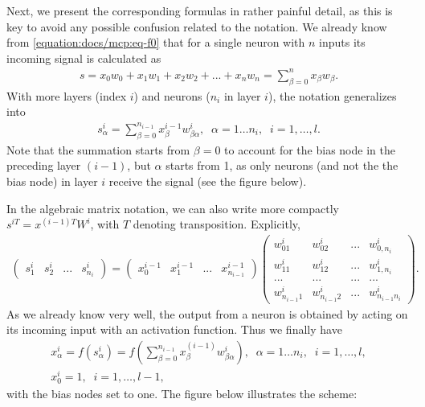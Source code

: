 \documentclass[letterpaper,10pt,english]{jupyterBook}
\begin{document}
\sphinxAtStartPar
Next, we present the corresponding formulas in rather painful detail, as this is key to avoid any possible confusion related to the notation.
We already know from \eqref{equation:docs/mcp:eq-f0} that for a single neuron with \(n\) inputs its incoming signal is calculated as
\begin{equation*}
\begin{split}s = x_0 w_0 + x_1 w_1 + x_2 w_2 + ... + x_n w_n = \sum_{\beta=0}^n x_\beta w_\beta .\end{split}
\end{equation*}
\sphinxAtStartPar
With more layers (index \(i\)) and neurons (\(n_i\) in layer \(i\)),
the notation generalizes into
\begin{equation*}
\begin{split}
s^i_\alpha=\sum_{\beta=0}^{n_{i-1}} x^{i-1}_\beta w^i_{\beta \alpha}, \;\; \alpha=1\dots n_i, \;\; i=1,\dots,l.
\end{split}
\end{equation*}
\sphinxAtStartPar
Note that the summation starts from \(\beta=0\) to account for the bias node in the preceding layer \((i-1)\), but \(\alpha\) starts from 1, as only neurons (and not the the bias node) in layer \(i\) receive the signal (see the figure below).

\sphinxAtStartPar
In the algebraic matrix notation, we can also write more compactly
\(s^{iT} = x^{(i-1)T} W^i\), with \(T\) denoting transposition. Explicitly,
\begin{equation*}
\begin{split}
\begin{pmatrix} s^i_1 & s^i_2 & ...& s^i_{n_i} \end{pmatrix} = 
\begin{pmatrix} x^{i-1}_0 & x^{i-1}_1 & ...& x^{i-1}_{n_{i-1}} \end{pmatrix}
\begin{pmatrix} w^i_{01} & w^i_{02} & ...& w^i_{0,n_i} \\ w^i_{11} & w^i_{12} & ...& w^i_{1,n_i} \\ 
 ... & ... & ...& ... \\ w^i_{n_{i-1}1} & w^i_{n_{i-1}2} & ...& w^i_{n_{i-1}n_i} \end{pmatrix}.
\end{split}
\end{equation*}
\sphinxAtStartPar
As we already know very well, the output from a neuron is obtained by acting on its incoming input with an activation function. Thus we finally have
\begin{equation*}
\begin{split} 
x^i_\alpha  = f(s^i_\alpha) = f \left (\sum_{\beta=0}^{n_{i-1}} x^{(i-1)}_\beta w^i_{\beta \alpha} \right), \;\; \alpha=1\dots n_i, \;\; i=1,\dots,l , \\
x^i_0 =1, \;\; i=1,\dots,l-1,  
\end{split}
\end{equation*}
\sphinxAtStartPar
with the bias nodes set to one.
The figure below illustrates the scheme:
\end{document}
